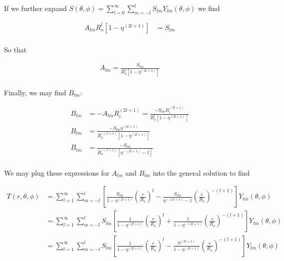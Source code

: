 \documentclass[a4paper,10pt]{article}
\begin{document}
If we further expand $S(\theta,\phi) = \displaystyle \sum_{l=0}^{\infty} \sum_{m=-l}^{l} S_{lm} Y_{lm}(\theta,\phi)$ we find 

\begin{equation}
\begin{aligned}
A_{lm} R_o^{l} \left[1 - \eta^{(2l+1)} \right] &= S_{lm} \\
\end{aligned}
\end{equation}

So that

\begin{equation}
\begin{aligned}
A_{lm} = \frac{S_{lm}}{ R_o^{l} \left[1 - \eta^{(2l+1)} \right]} \\
\end{aligned}
\end{equation}

Finally, we may find $B_{lm}$:

\begin{equation}
\begin{aligned}
B_{lm} &= -A_{lm} R_i^{(2l+1)} = \frac{-S_{lm} R_i^{(2l+1)}}{ R_o^{l} \left[1 - \eta^{(2l+1)} \right]} \\
B_{lm} &= \frac{-S_{lm} \eta^{(2l+1)}}{ R_o^{-(l+1)} \left[1 - \eta^{(2l+1)} \right]} \\
B_{lm} &= \frac{-S_{lm}}{ R_o^{-(l+1)} \left[\eta^{-(2l+1)} - 1 \right]} \\
\end{aligned}
\end{equation}

We may plug these expressions for $A_{lm}$ and $B_{lm}$ into the general solution to find

\begin{equation}
\begin{aligned}
T(r, \theta, \phi) &= \displaystyle \sum_{l=1}^{\infty} \sum_{m=-l}^{l} \left[ \frac{S_{lm}}{1-\eta^{(2l+1)}} \left(\frac{r}{R_o}\right)^l -  \frac{S_{lm}}{\eta^{-(2l+1)}-1} \left(\frac{r}{R_o}\right)^{-(l+1)} \right] Y_{lm}(\theta,\phi) \\
 &= \displaystyle \sum_{l=1}^{\infty} \sum_{m=-l}^{l} S_{lm} \left[ \frac{1}{1-\eta^{(2l+1)}} \left(\frac{r}{R_o}\right)^l +  \frac{1}{1-\eta^{-(2l+1)}} \left(\frac{r}{R_o}\right)^{-(l+1)} \right] Y_{lm}(\theta,\phi) \\
 &= \displaystyle \sum_{l=1}^{\infty} \sum_{m=-l}^{l} S_{lm} \left[ \frac{1}{1-\eta^{(2l+1)}} \left(\frac{r}{R_o}\right)^l -  \frac{\eta^{(2l+1)}}{1-\eta^{(2l+1)}} \left(\frac{r}{R_o}\right)^{-(l+1)} \right] Y_{lm}(\theta,\phi)
\end{aligned}
\end{equation}
\end{document}
